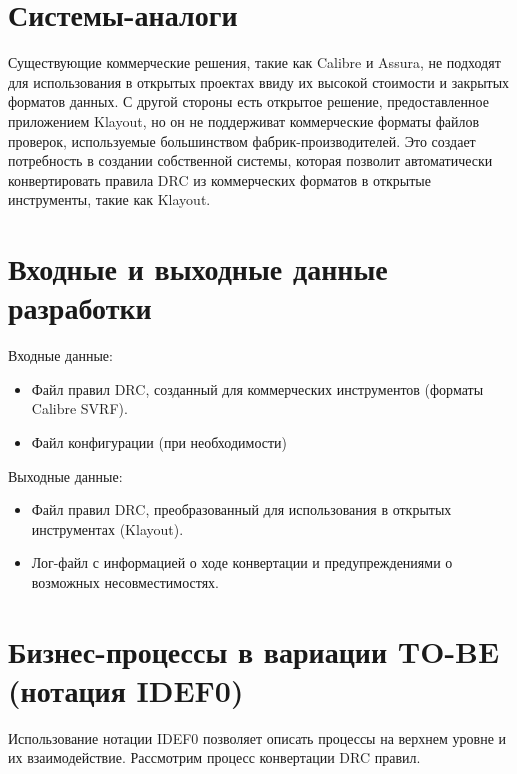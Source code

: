 \section{Системы-аналоги}

Существующие коммерческие решения, такие как Calibre и Assura,
не подходят для использования в открытых проектах ввиду их высокой стоимости
и закрытых форматов данных.
С другой стороны есть открытое решение, предоставленное приложением Klayout,
но он не поддерживат коммерческие форматы файлов проверок,
используемые большинством фабрик-производителей.
Это создает потребность в создании собственной системы,
которая позволит автоматически конвертировать правила DRC
из коммерческих форматов в открытые инструменты, такие как Klayout.


\section{Входные и выходные данные разработки}

Входные данные:

\begin{itemize}
	\item Файл правил DRC, созданный для коммерческих инструментов
		(форматы Calibre SVRF).
	\item Файл конфигурации (при необходимости)
\end{itemize}

Выходные данные:

\begin{itemize}
	\item Файл правил DRC, преобразованный для использования
		в открытых инструментах (Klayout).
	\item Лог-файл с информацией о ходе конвертации
		и предупреждениями о возможных несовместимостях.
\end{itemize}

\section{Бизнес-процессы в вариации TO-BE (нотация IDEF0)}

Использование нотации IDEF0 позволяет описать процессы на верхнем уровне
и их взаимодействие. Рассмотрим процесс конвертации DRC правил.

\begin{image}
\end{image}

